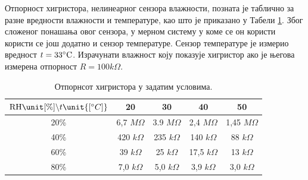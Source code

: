 \PID
Отпорност хигристора, нелинеарног сензора влажности, позната је таблично за разне вредности влажности и температуре, као што је 
приказано у Табели \ref{tab:\ID:in}. Због сложеног понашања овог сензора, у мерном систему у коме се он користи користи се још
додатно и сензор температуре. Сензор температуре је измерио вредност $t = 33\rm^\circ C$. Израчунати влажност коју показује хигристор
ако је његова измерена отпорност $R = 100\unit{k\Omega}$.

\begin{table}
\centering  
\begin{tabular}{c|cccc}
\hline
${\rm RH}\unit{[\%]}\backslash t\unit{[^\circ C]}$ & 20 & 30 & 40 & 50 \\
\hline
20\% & 6,7 $\unit{M\Omega}$ & 3.9 $\unit{M\Omega}$ & 2,4 $\unit{M\Omega}$ & 1,45 $\unit{M\Omega}$ \\
40\% & 420 $\unit{k\Omega}$ & 235 $\unit{k\Omega}$ & 140 $\unit{k\Omega}$ & 88 $\unit{k\Omega}$ \\
60\% & 39 $\unit{k\Omega}$ & 25 $\unit{k\Omega}$ & 17,5 $\unit{k\Omega}$ & 13 $\unit{k\Omega}$ \\
80\% & 7,0 $\unit{k\Omega}$ & 5,0 $\unit{k\Omega}$ & 3,9 $\unit{k\Omega}$ & 3,0 $\unit{k\Omega}$ \\
\hline
\end{tabular}
\caption{Отпорнсот хигристора у задатим условима.}
\label{tab:\ID:in}
\end{table}